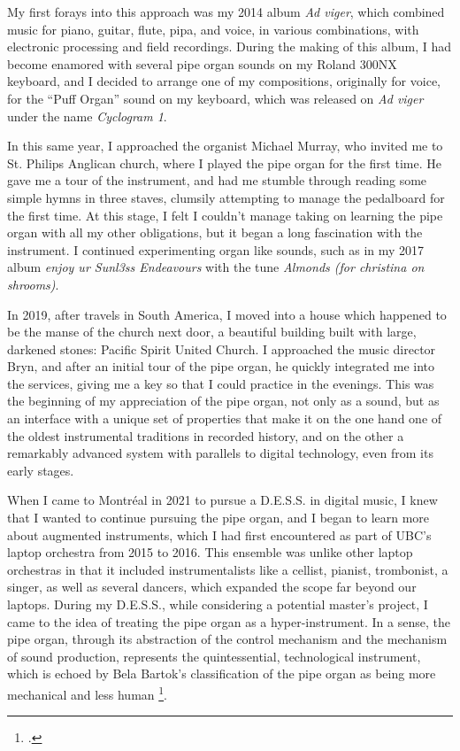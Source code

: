 \documentclass[12pt,twoside,maitrise]{dms_ks}
\theoremstyle{definition}
\begin{document}
{My first forays into this approach was my 2014 album \textit{Ad viger}, which combined music for piano, guitar, flute, pipa, and voice, in various combinations, with electronic processing and field recordings. 
During the making of this album, I had become enamored with several pipe organ sounds on my Roland 300NX keyboard, and I decided to arrange one of my compositions, originally for voice, for the “Puff Organ” sound on my keyboard, which was released on \textit{Ad viger} under the name \textit{Cyclogram 1}.

In this same year, I approached the organist Michael Murray, who invited me to St. 
Philips Anglican church, where I played the pipe organ for the first time. 
He gave me a tour of the instrument, and had me stumble through reading some simple hymns in three staves, clumsily attempting to manage the pedalboard for the first time. 
At this stage, I felt I couldn't manage taking on learning the pipe organ with all my other obligations, but it began a long fascination with the instrument. 
I continued experimenting organ like sounds, such as in my 2017 album \textit{enjoy ur Sunl3ss Endeavours} with the tune \textit{Almonds (for christina on shrooms)}. 

In 2019, after travels in South America, I moved into a house which happened to be the manse of the church next door, a beautiful building built with large, darkened stones: Pacific Spirit United Church. 
I approached the music director Bryn, and after an initial tour of the pipe organ, he quickly integrated me into the services, giving me a key so that I could practice in the evenings. 
This was the beginning of my appreciation of the pipe organ, not only as a sound, but as an interface with a unique set of properties that make it on the one hand one of the oldest instrumental traditions in recorded history, and on the other a remarkably advanced system with parallels to digital technology, even from its early stages.

When I came to Montréal in 2021 to pursue a D.E.S.S. in digital music, I knew that I wanted to continue pursuing the pipe organ, and I began to learn more about augmented instruments, which I had first encountered as part of UBC's laptop orchestra from 2015 to 2016. 
This ensemble was unlike other laptop orchestras in that it included instrumentalists like a cellist, pianist, trombonist, a singer, as well as several dancers, which expanded the scope far beyond our laptops. 
During my D.E.S.S., while considering a potential master's project, I came to the idea of treating the pipe organ as a hyper-instrument. 
In a sense, the pipe organ, through its abstraction of the control mechanism and the mechanism of sound production, represents the quintessential, technological instrument, which is echoed by Bela Bartok's classification of the pipe organ as being more mechanical and less human \footcite[24]{jorda_digital_2005}. 
 
}
\end{document}
